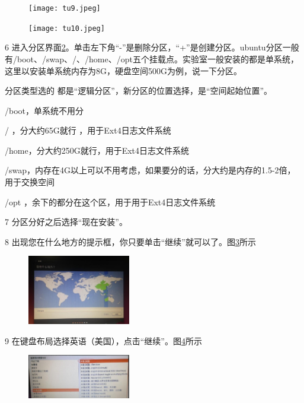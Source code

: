 \documentclass[12pt]{article}
\begin{document}
\begin{figure}[!htb] %
\centering
\texttt{[image: tu9.jpeg]}
\caption{}
\label{tu9}
\end{figure} 
\begin{figure}[!htb] %
\centering
\texttt{[image: tu10.jpeg]}
\caption{}
\label{tu10}
\end{figure} 

  6 进入分区界面\ref{tu10}。单击左下角“-”是删除分区，“+”是创建分区。ubuntu分区一般有/boot、/swap、/、/home、/opt五个挂载点。实验室一般安装的都是单系统，这里以安装单系统内存为8G，硬盘空间500G为例，说一下分区。

分区类型选的 都是“逻辑分区”，新分区的位置选择，是“空间起始位置”。

/boot，单系统不用分

/    ，分大约65G就行 ，用于Ext4日志文件系统

/home，分大约250G就行，用于Ext4日志文件系统

/swap，内存在4G以上可以不用考虑，如果要分的话，分大约是内存的1.5-2倍，用于交换空间

/opt ，余下的都分在这个区，用于用于Ext4日志文件系统

  7 分区分好之后选择“现在安装”。

  8 出现您在什么地方的提示框，你只要单击“继续”就可以了。图\ref{tu12}所示

\begin{figure}[!htb] %
\centering
\includegraphics[width=0.4\textwidth]{tu12.jpeg}
\caption{}
\label{tu12}
\end{figure} 

  9 在键盘布局选择英语（美国），点击“继续”。图\ref{tu13}所示
\begin{figure}[!htb] %
\centering
\includegraphics[width=0.4\textwidth]{tu13.jpeg}
\caption{}
\label{tu13}
\end{figure} 
\end{document}
